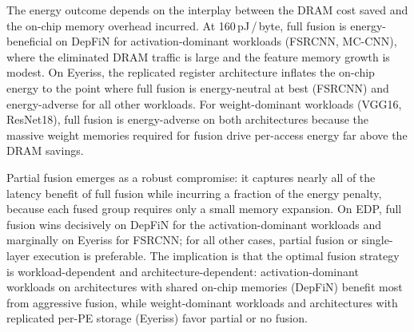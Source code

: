 The energy outcome depends on the interplay between the DRAM cost
saved and the on-chip memory overhead incurred.
At 160\,pJ\,/\,byte, full fusion is energy-beneficial on DepFiN
for activation-dominant workloads (FSRCNN, MC-CNN), where the
eliminated DRAM traffic is large and the feature memory growth is
modest.
On Eyeriss, the replicated register architecture inflates the
on-chip energy to the point where full fusion is
energy-neutral at best (FSRCNN) and energy-adverse for all other
workloads.
For weight-dominant workloads (VGG16, ResNet18), full fusion is
energy-adverse on both architectures because the massive weight
memories required for fusion drive per-access energy far above
the DRAM savings.

Partial fusion emerges as a robust compromise: it captures nearly
all of the latency benefit of full fusion while incurring a
fraction of the energy penalty, because each fused group requires
only a small memory expansion.
On EDP, full fusion wins decisively on DepFiN for the
activation-dominant workloads and marginally on Eyeriss for
FSRCNN; for all other cases, partial fusion or single-layer
execution is preferable.
The implication is that the optimal fusion strategy is
workload-dependent and architecture-dependent: activation-dominant
workloads on architectures with shared on-chip memories (DepFiN)
benefit most from aggressive fusion, while weight-dominant
workloads and architectures with replicated per-PE storage
(Eyeriss) favor partial or no fusion.